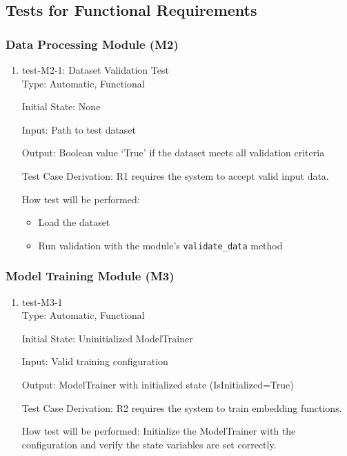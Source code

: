 \documentclass[12pt, titlepage]{article}
\begin{document}
\subsection{Tests for Functional Requirements}


\subsubsection{Data Processing Module (M2)}

\begin{enumerate}
  \item{test-M2-1: Dataset Validation Test\\}
  Type: Automatic, Functional
            
  Initial State: None
            
  Input: Path to test dataset

            
  Output: Boolean value `True' if the dataset meets all validation criteria

  Test Case Derivation: R1 requires the system to accept valid input data.
  
  How test will be performed: 
  \begin{itemize}
    \item Load the dataset
    \item Run validation with the module's \texttt{validate\_data} method
  \end{itemize}
\end{enumerate}

\subsubsection{Model Training Module (M3)}

\begin{enumerate}

\item{test-M3-1\\}
Type: Automatic, Functional
					
Initial State: Uninitialized ModelTrainer
					
Input: Valid training configuration
					
Output: ModelTrainer with initialized state (IsInitialized=True)

Test Case Derivation: R2 requires the system to train embedding functions.

How test will be performed: Initialize the ModelTrainer with the configuration and verify the state variables are set correctly.

\end{enumerate}
\end{document}
